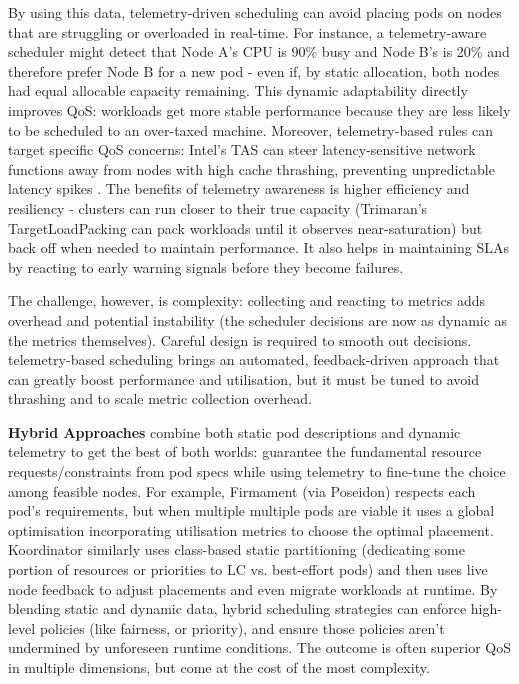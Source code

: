 By using this data, telemetry-driven scheduling can avoid placing pods on nodes
that are struggling or overloaded in real-time. For instance, a telemetry-aware
scheduler might detect that Node A's CPU is 90\% busy and Node B's is 20\% and
therefore prefer Node B for a new pod - even if, by static allocation, both
nodes had equal allocable capacity remaining. This dynamic adaptability
directly improves QoS: workloads get more stable performance because they are
less likely to be scheduled to an over-taxed machine. Moreover, telemetry-based
rules can target specific QoS concerns: Intel's TAS can steer latency-sensitive
network functions away from nodes with high cache thrashing, preventing
unpredictable latency spikes \cite{}. The benefits of telemetry awareness is
higher efficiency and resiliency - clusters can run closer to their true capacity
(Trimaran's TargetLoadPacking can pack workloads until it observes
near-saturation) but back off when needed to maintain performance. It also helps
in maintaining SLAs by reacting to early warning signals before they become
failures.

The challenge, however, is complexity: collecting and reacting to metrics adds
overhead and potential instability (the scheduler decisions are now as dynamic
as the metrics themselves). Careful design is required to smooth out decisions.
telemetry-based scheduling brings an automated, feedback-driven approach that
can greatly boost performance and utilisation, but it must be tuned to avoid
thrashing and to scale metric collection overhead.

\textbf{Hybrid Approaches} combine both static pod descriptions and dynamic
telemetry to get the best of both worlds: guarantee the fundamental resource
requests/constraints from pod specs while using telemetry to fine-tune the
choice among feasible nodes. For example, Firmament (via Poseidon) \cite{}
respects each pod's requirements, but when multiple multiple pods are viable it
uses a global optimisation incorporating utilisation metrics to choose the
optimal placement. Koordinator \cite{} similarly uses class-based static
partitioning (dedicating some portion of resources or priorities to LC vs.
best-effort pods) and then uses live node feedback to adjust placements and even
migrate workloads at runtime. By blending static and dynamic data, hybrid
scheduling strategies can enforce high-level policies (like fairness, or
priority), and ensure those policies aren't undermined by unforeseen runtime
conditions. The outcome is often superior QoS in multiple dimensions, but come
at the cost of the most complexity.


